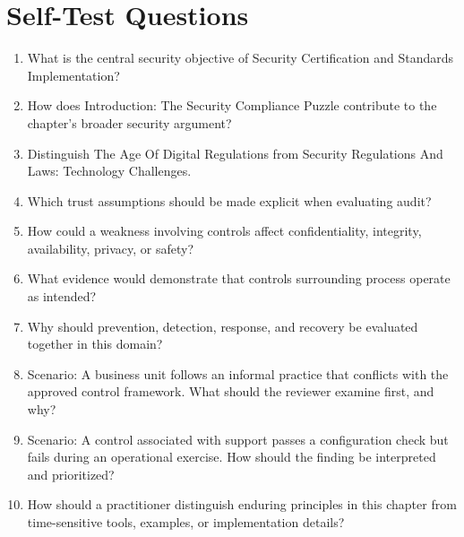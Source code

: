 \documentclass[11pt]{article}
\begin{document}
\section*{Self-Test Questions}
\begin{enumerate}
\item What is the central security objective of Security Certification and Standards Implementation?
\item How does Introduction: The Security Compliance Puzzle contribute to the chapter's broader security argument?
\item Distinguish The Age Of Digital Regulations from Security Regulations And Laws: Technology Challenges.
\item Which trust assumptions should be made explicit when evaluating audit?
\item How could a weakness involving controls affect confidentiality, integrity, availability, privacy, or safety?
\item What evidence would demonstrate that controls surrounding process operate as intended?
\item Why should prevention, detection, response, and recovery be evaluated together in this domain?
\item Scenario: A business unit follows an informal practice that conflicts with the approved control framework. What should the reviewer examine first, and why?
\item Scenario: A control associated with support passes a configuration check but fails during an operational exercise. How should the finding be interpreted and prioritized?
\item How should a practitioner distinguish enduring principles in this chapter from time-sensitive tools, examples, or implementation details?
\end{enumerate}
\end{document}
